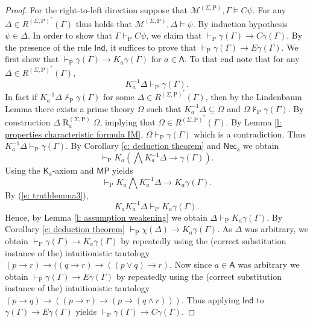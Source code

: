 \documentclass{myifcolog}
\newcommand\C {C}
\newcommand{\K}{K}
\newcommand\A{\mathsf{A}}
\newcommand{\agi}{a}
\newcommand{\E}{E}
\newcommand{\fw}{\mathcal{M}}
\newcommand{\Rel}{\mathrel{R}}
\newcommand{\hickp}{\mathrm{P}}
\numberwithin{theorem}{section}
\begin{document}
\begin{proof}
     For the right-to-left direction suppose that $\fw^{(\Sigma, \hickp)}, \Gamma \models \C \psi$. For any $\Delta \in R^{(\Sigma, \hickp)^*}(\Gamma)$ thus holds that $\fw^{(\Sigma, \hickp)}, \Delta \models \psi$. By induction hypothesis $\psi \in \Delta$. In order to show that $\Gamma \vdash_\mathrm{P} \C \psi$, we claim that $\vdash_\mathrm{P} \gamma(\Gamma) \rightarrow \C \gamma(\Gamma)$. By the presence of the rule $\mathsf{Ind}$, it suffices to prove that $\vdash_\mathrm{P} \gamma(\Gamma) \rightarrow \E \gamma(\Gamma)$. We first show that $\vdash_\mathrm{P} \gamma(\Gamma) \rightarrow \K_\agi \gamma(\Gamma)$ for $\agi \in \A$. To that end note that for any $\Delta \in R^{(\Sigma, \hickp)^*}(\Gamma)$,
        \begin{equation*}
            \K_\agi^{-1} \Delta \vdash_\mathrm{P} \gamma(\Gamma).
        \end{equation*}
        In fact if $ \K_\agi^{-1} \Delta \not \vdash_\mathrm{P} \gamma(\Gamma)$ for some $\Delta \in R^{(\Sigma, \hickp)^*}(\Gamma)$, then by the Lindenbaum Lemma there exists a prime theory $\Omega$ such that $\K_\agi^{-1}\Delta \subseteq \Omega$ and $\Omega \not \vdash_\mathrm{P} \gamma(\Gamma)$. By construction $\Delta \Rel_\agi^{(\Sigma, \hickp)} \Omega$, implying that $\Omega \in R^{(\Sigma, \hickp)^*}(\Gamma)$. By Lemma \ref{l: properties characteristic formula IM}, $\Omega \vdash_\mathrm{P} \gamma(\Gamma)$ which is a contradiction. Thus $\K_\agi^{-1} \Delta \vdash_\mathrm{P} \gamma(\Gamma)$. By Corollary \ref{c: deduction theorem} and $\mathsf{Nec_\agi}$ we obtain
        \begin{equation*}
            \vdash_\mathrm{P} \K_\agi (\bigwedge \K_\agi^{-1} \Delta \rightarrow \gamma(\Gamma)).
        \end{equation*}
    Using the $\mathsf{K_\agi}$-axiom and $\mathsf{MP}$ yields
    \begin{equation*}
        \vdash_\mathrm{P} \K_\agi \bigwedge \K_\agi^{-1} \Delta \rightarrow \K_\agi \gamma(\Gamma).
    \end{equation*}
    By (\ref{e: truthlemma3}),
    \begin{equation*}
        \K_\agi \K_\agi^{-1} \Delta \vdash_\mathrm{P} \K_\agi \gamma(\Gamma).
    \end{equation*}
    Hence, by Lemma \ref{l: assumption weakening} we obtain $\Delta \vdash_\mathrm{P} \K_\agi \gamma(\Gamma)$. By Corollary \ref{c: deduction theorem} $\vdash_\mathrm{P} \chi(\Delta) \rightarrow \K_\agi \gamma(\Gamma)$. As $\Delta$ was arbitrary, we obtain $\vdash_\mathrm{P} \gamma(\Gamma) \rightarrow \K_\agi \gamma(\Gamma)$ by repeatedly using the (correct substitution instance of the) intuitionistic tautology $(p \rightarrow r) \rightarrow ((q \rightarrow r) \rightarrow ((p \vee q) \rightarrow r)$. Now since $\agi \in \A$ was arbitrary we obtain $\vdash_\mathrm{P} \gamma(\Gamma) \rightarrow \E \gamma(\Gamma)$ by repeatedly using the (correct substitution instance of the) intuitionistic tautology $(p \rightarrow q) \rightarrow ((p \rightarrow r) \rightarrow (p \rightarrow (q \wedge r)))$. Thus applying $\mathsf{Ind}$ to $\gamma(\Gamma) \rightarrow \E \gamma(\Gamma)$ yields $\vdash_\mathrm{P} \gamma(\Gamma) \rightarrow \C \gamma(\Gamma)$. \smallskip
    

\end{proof}
\end{document}
